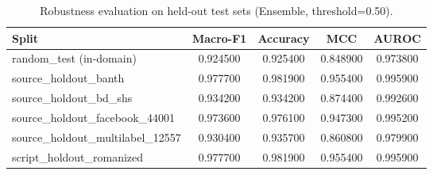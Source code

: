 \begin{table}[t]
\centering
\caption{Robustness evaluation on held-out test sets (Ensemble, threshold=0.50).}
\label{tab:robustness}
\begin{tabular}{lcccc}
\toprule
Split & Macro-F1 & Accuracy & MCC & AUROC \\
\midrule
random\_test (in-domain) & 0.924500 & 0.925400 & 0.848900 & 0.973800 \\
source\_holdout\_banth & 0.977700 & 0.981900 & 0.955400 & 0.995900 \\
source\_holdout\_bd\_shs & 0.934200 & 0.934200 & 0.874400 & 0.992600 \\
source\_holdout\_facebook\_44001 & 0.973600 & 0.976100 & 0.947300 & 0.995200 \\
source\_holdout\_multilabel\_12557 & 0.930400 & 0.935700 & 0.860800 & 0.979900 \\
script\_holdout\_romanized & 0.977700 & 0.981900 & 0.955400 & 0.995900 \\
\bottomrule
\end{tabular}
\end{table}
